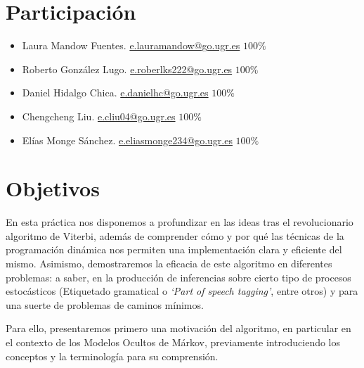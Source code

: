 \documentclass{article}
\newcommand{\email}[1]{\href{mailto:#1}{{{\color{blue}#1}}}}
\begin{document}

    
    

    \newpage

    
\section{Participación}
    \begin{itemize}
        \item Laura Mandow Fuentes. \email{e.lauramandow@go.ugr.es}  $100\%$
        \item Roberto González Lugo. \email{e.roberlks222@go.ugr.es}  $100\%$
        \item Daniel Hidalgo Chica. \email{e.danielhc@go.ugr.es}  $100\%$
        \item Chengcheng Liu. \email{e.cliu04@go.ugr.es} $100\%$
        \item Elías Monge Sánchez. \email{e.eliasmonge234@go.ugr.es}  $100\%$
    \end{itemize}

\newpage
\section{Objetivos}

En esta práctica nos disponemos a profundizar en las ideas tras
el revolucionario algoritmo de Viterbi, además de comprender
cómo y por qué las técnicas de la programación dinámica nos 
permiten una implementación clara y eficiente del mismo. 
Asimismo, demostraremos la eficacia de este algoritmo 
en diferentes problemas: a saber, en la producción
de inferencias sobre cierto tipo de procesos estocásticos (Etiquetado gramatical o \textit{`Part of speech tagging'}, entre otros) y para una suerte de problemas de caminos mínimos.

Para ello, presentaremos primero una motivación del algoritmo, 
en particular en el contexto de los Modelos Ocultos de Márkov,
previamente introduciendo los conceptos y la terminología para
su comprensión.
\end{document}
